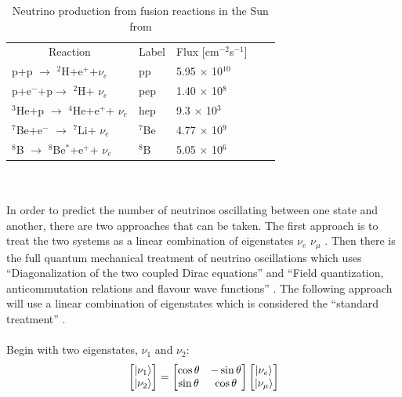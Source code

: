 \begin{table}
\centering
\begin{tabular}{lllll}  
\toprule
\multicolumn{1}{c}{Reaction} & \multicolumn{1}{c}{Label} & \multicolumn{1}{c}{Flux [cm$^{-2}$s$^{-1}$]}
\\
\cmidrule(r){1-1}
\cmidrule(r){2-2}
\cmidrule(r){3-3}
p+p $\rightarrow$ $^2$H+e$^+$+$\nu_e$           & pp                & 5.95 $\times$ 10$^{10}$\\
p+e$^-$+p$\rightarrow$ $^2$H+ $\nu_e$           & pep               & 1.40 $\times$ 10$^{8}$\\
$^3$He+p $\rightarrow$ $^4$He+e$^+$+ $\nu_e$     & hep               & 9.3  $\times$ 10$^{3}$\\
$^7$Be+e$^-$ $\rightarrow$ $^7$Li+ $\nu_e$       & $^7$Be            & 4.77 $\times$ 10$^{9}$\\
$^8$B $\rightarrow$ $^8$Be$^*$+e$^+$+ $\nu_e$   & $^8$B             & 5.05 $\times$ 10$^{6}$\\
\bottomrule   
\end{tabular}
\caption{Neutrino production from fusion reactions in the Sun from \cite{Bellerive:2003rj} }
\label{solar_nuetrino_table}
\end{table}
\\\\In order to predict the number of neutrinos oscillating between one state and another, there are two approaches that can be taken. The first approach is to treat the two systems as a linear combination of eigenstates $\nu_e$ $\nu_\mu$ \cite{griffiths2008book}\cite{griffiths2008neutrinoOscillations} \cite{sassaroli1999neutrino}. Then there is the full quantum mechanical treatment of neutrino oscillations which uses ``Diagonalization of the two coupled Dirac equations'' and ``Field quantization, anticommutation relations and flavour wave functions'' \cite{sassaroli1999neutrino}. The following approach will use a linear combination of eigenstates which is considered the ``standard treatment'' \cite{sassaroli1999neutrino} \cite{griffiths2008book} \cite{griffiths2008neutrinoOscillations}.
\\\\Begin with two eigenstates, $\nu_1$ and $\nu_2$: 
\begin{equation}
    \begin{bmatrix}
        \ket{\nu_1} \\
        \ket{\nu_2}
    \end{bmatrix}
    =
    \begin{bmatrix}
        \cos\theta & -\sin\theta \\
        \sin\theta & \cos\theta 
    \end{bmatrix}
        \begin{bmatrix}
        \ket{\nu_e} \\
        \ket{\nu_\mu}
    \end{bmatrix}
    \label{linear_combination_eq_1}
\end{equation}
